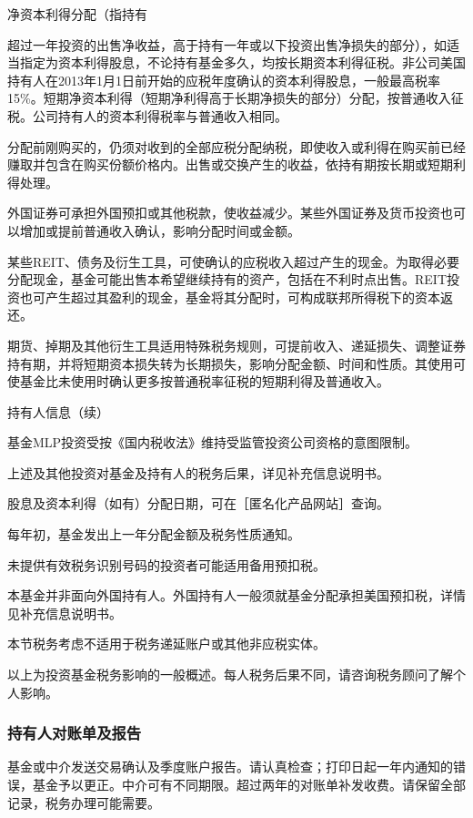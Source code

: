\documentclass[UTF8,fontset=none,11pt,a4paper]{ctexart}
\begin{document}
净资本利得分配（指持有

超过一年投资的出售净收益，高于持有一年或以下投资出售净损失的部分），如适当指定为资本利得股息，不论持有基金多久，均按长期资本利得征税。非公司美国持有人在2013年1月1日前开始的应税年度确认的资本利得股息，一般最高税率15\%。短期净资本利得（短期净利得高于长期净损失的部分）分配，按普通收入征税。公司持有人的资本利得税率与普通收入相同。

分配前刚购买的，仍须对收到的全部应税分配纳税，即使收入或利得在购买前已经赚取并包含在购买份额价格内。出售或交换产生的收益，依持有期按长期或短期利得处理。

外国证券可承担外国预扣或其他税款，使收益减少。某些外国证券及货币投资也可以增加或提前普通收入确认，影响分配时间或金额。

某些REIT、债务及衍生工具，可使确认的应税收入超过产生的现金。为取得必要分配现金，基金可能出售本希望继续持有的资产，包括在不利时点出售。REIT投资也可产生超过其盈利的现金，基金将其分配时，可构成联邦所得税下的资本返还。

期货、掉期及其他衍生工具适用特殊税务规则，可提前收入、递延损失、调整证券持有期，并将短期资本损失转为长期损失，影响分配金额、时间和性质。其使用可使基金比未使用时确认更多按普通税率征税的短期利得及普通收入。


\par{}\label{originalpage22}
持有人信息（续）

基金MLP投资受按《国内税收法》维持受监管投资公司资格的意图限制。

上述及其他投资对基金及持有人的税务后果，详见补充信息说明书。

股息及资本利得（如有）分配日期，可在［匿名化产品网站］查询。

每年初，基金发出上一年分配金额及税务性质通知。

未提供有效税务识别号码的投资者可能适用备用预扣税。

本基金并非面向外国持有人。外国持有人一般须就基金分配承担美国预扣税，详情见补充信息说明书。

本节税务考虑不适用于税务递延账户或其他非应税实体。

以上为投资基金税务影响的一般概述。每人税务后果不同，请咨询税务顾问了解个人影响。

\subsubsection*{持有人对账单及报告}\label{unitU821}
基金或中介发送交易确认及季度账户报告。请认真检查；打印日起一年内通知的错误，基金予以更正。中介可有不同期限。超过两年的对账单补发收费。请保留全部记录，税务办理可能需要。
\end{document}
